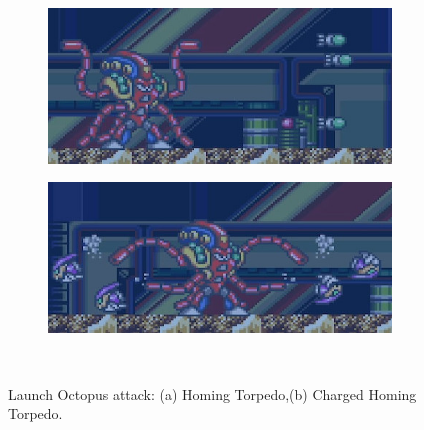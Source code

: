 \begin{figure}[h]
	\centering
	\begin{subfigure}{0.5\textwidth}
		\centering
		\includegraphics[width=\linewidth]{figures/X1/Octopus_missile.jpg}
		\caption{}
	\end{subfigure}
	\begin{subfigure}{0.49\textwidth}
		\centering
		\includegraphics[width=\linewidth]{figures/X1/Octopus_piranha.jpg}
		\caption{}
	\end{subfigure}\\
	\caption{Launch Octopus attack: (a) Homing Torpedo,(b) Charged Homing Torpedo.}
\end{figure}

